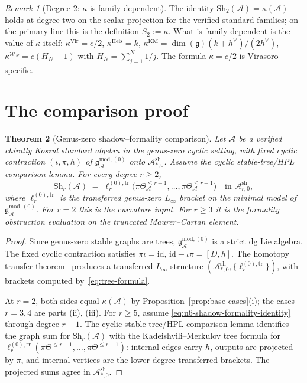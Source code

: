 \documentclass[11pt,reqno]{amsart}
\newtheorem{theorem}{Theorem}[section]
\theoremstyle{definition}
\theoremstyle{remark}
\newtheorem{remark}[theorem]{Remark}
\providecommand{\cA}{\mathcal{A}}
\providecommand{\fg}{\mathfrak{g}}
\providecommand{\gmodzero}{\mathfrak{g}^{\mathrm{mod},(0)}_{\cA}}
\providecommand{\Sh}{\mathrm{Sh}}
\providecommand{\Vir}{\mathrm{Vir}}
\providecommand{\Heis}{\mathrm{Heis}}
\providecommand{\Ash}{\cA^{\mathrm{sh}}}
\providecommand{\Linf}{L_\infty}
\providecommand{\cW}{\mathcal{W}}
\numberwithin{equation}{section}
\begin{document}
\begin{remark}[Degree-$2$: $\kappa$ is family-dependent]
\label{rem:kappa-not-universal}
The identity $\Sh_2(\cA)=\kappa(\cA)$ holds at degree two on the
scalar projection for the verified standard families;
on the primary line this is the definition $S_2:=\kappa$.
What is family-dependent is the value of $\kappa$ itself:
$\kappa^{\Vir}=c/2$, $\kappa^{\Heis}=k$,
$\kappa^{\mathrm{KM}}=\dim(\fg)(k+h^\vee)/(2h^\vee)$,
$\kappa^{\cW_N}=c(H_N-1)$ with $H_N=\sum_{j=1}^N 1/j$. The
formula $\kappa=c/2$ is Virasoro-specific.
\end{remark}

\section{The comparison proof}\label{sec:n6-shadow-formality-proof}

\begin{theorem}[Genus-zero shadow--formality comparison]
\label{thm:n6-shadow-formality-comparison}
Let $\cA$ be a verified chirally Koszul standard algebra in the
genus-zero cyclic setting, with fixed cyclic contraction
$(\iota,\pi,h)$ of $\gmodzero$ onto $\Ash_{*,0}$. Assume the
cyclic stable-tree/HPL comparison lemma. For every degree
$r\ge 2$,
\begin{equation}\label{eq:n6-shadow-formality-identity}
\Sh_r(\cA)\;=\;\ell_r^{(0),\mathrm{tr}}
\bigl(\pi\Theta^{\le r-1}_{\cA},\ldots,
\pi\Theta^{\le r-1}_{\cA}\bigr)
\quad\text{in }\Ash_{r,0},
\end{equation}
where $\ell_r^{(0),\mathrm{tr}}$ is the transferred genus-zero
$\Linf$ bracket on the minimal model of $\gmodzero$.
For $r=2$ this is the curvature input. For $r\ge3$ it is the
formality obstruction evaluation on the truncated Maurer--Cartan
element.
\end{theorem}

\begin{proof}
Since genus-zero stable graphs are trees, $\gmodzero$ is a
strict dg Lie algebra. The fixed cyclic contraction satisfies
$\pi\iota=\mathrm{id}$, $\mathrm{id}-\iota\pi=[D,h]$. The
homotopy transfer
theorem~\cite{Kadeishvili80,KontsevichSoibelman00,LodayVallette12}
produces a transferred $\Linf$ structure
$(\Ash_{*,0},\{\ell_r^{(0),\mathrm{tr}}\})$, with brackets
computed by~\eqref{eq:tree-formula}.

At $r=2$, both sides equal $\kappa(\cA)$ by
Proposition~\ref{prop:base-cases}(i); the cases $r=3,4$ are
parts (ii), (iii). For $r\ge5$, assume
\eqref{eq:n6-shadow-formality-identity} through degree $r-1$. The
cyclic stable-tree/HPL comparison lemma identifies the graph sum for
$\Sh_r(\cA)$ with the Kadeishvili--Merkulov tree formula for
$\ell_r^{(0),\mathrm{tr}}(\pi\Theta^{\le r-1},\dots,
\pi\Theta^{\le r-1})$: internal edges carry $h$, outputs are
projected by $\pi$, and internal vertices are the lower-degree
transferred brackets. The projected sums agree in $\Ash_{*,0}$.
\end{proof}
\end{document}
